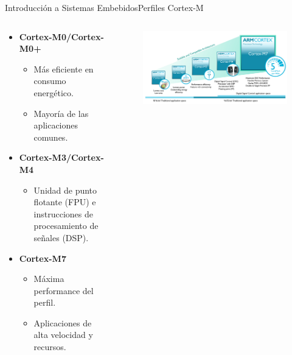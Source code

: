 \documentclass[aspectratio=169, xcolor=dvipsnames]{beamer}
\begin{document}
\begin{frame}{Introducción a Sistemas Embebidos}{Perfiles Cortex-M}
\begin{columns}
    \begin{column}{0.5\textwidth}
        \begin{itemize}
            \item \textbf{Cortex-M0/Cortex-M0+}
                \begin{itemize}
                    \item Más eficiente en consumo energético.
                    \item Mayoría de las aplicaciones comunes.
                \end{itemize}
            \item \textbf{Cortex-M3/Cortex-M4}
                \begin{itemize}
                    \item Unidad de punto flotante (FPU) e instrucciones de procesamiento de señales (DSP).
                \end{itemize}
            \item \textbf{Cortex-M7}
                \begin{itemize}
                    \item Máxima performance del perfil.
                    \item Aplicaciones de alta velocidad y recursos.
                \end{itemize}
        \end{itemize}
    \end{column}
    \begin{column}{0.5\textwidth}
        \begin{figure}
            \centering
            \includegraphics[width=0.85\linewidth]{resources/images/arm_cortex_m.png}
        \end{figure}
    \end{column}
\end{columns}
\end{frame}
\end{document}
